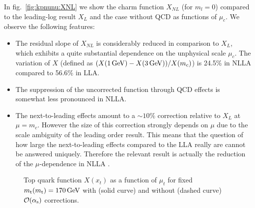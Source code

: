 In fig.\ \ref{fig:kpnunu:XNL} we show the charm function $X_{NL}$ (for
$m_l=0$) compared to the leading-log result $X_L$ and the case without
QCD as functions of $\mu_c$. We observe the following features:
\begin{itemize}
\item
The residual slope of $X_{NL}$ is considerably reduced in
comparison to $X_L$, which exhibits a quite substantial dependence
on the unphysical scale $\mu_c$. The variation
of $X$ (defined as $(X(1\, {\rm GeV})-X(3\, {\rm GeV}))/X(m_c)$)
is 24.5\% in NLLA compared to 56.6\% in LLA.
\item
The suppression of the
uncorrected function through QCD effects is somewhat less pronounced
in NLLA.
\item
The next-to-leading effects amount to a $\sim 10\%$ correction relative
to $X_L$ at $\mu=m_c$. However the size of this correction strongly
depends on $\mu$ due to the scale ambiguity of the leading order
result. This means that the question of how large the next-to-leading
effects compared to the LLA really are cannot be answered uniquely.
Therefore the relevant result is actually the reduction of the
$\mu$-dependence in NLLA .
\end{itemize}

\begin{figure}[hbt]
\vspace{0.10in}
\centerline{
\epsfysize=5in
 }
\vspace{0.08in}
\caption[]{
Top quark function $X(x_t)$ as a function of $\mu_t$ for fixed
$m_{\rm t}(m_{\rm t})=170\, {\rm GeV}$ with (solid curve) and without (dashed curve)
${\cal O}(\alpha_{\rm s})$ corrections.
\label{fig:kpnunu:X}}
\end{figure}

